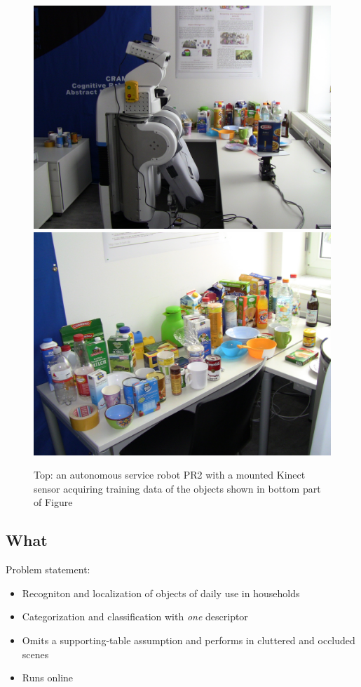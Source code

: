 \documentclass[conference]{sty/IEEEtran}
\begin{document}
\begin{figure}[htb!]
  \begin{center}
    \includegraphics[width=.9\columnwidth]{figures/objects/pr2_rot_table.jpg}
    \includegraphics[width=.9\columnwidth]{figures/objects/objects.jpg}
    \caption{Top: an autonomous service robot PR2 with a mounted Kinect sensor
    acquiring training data of the objects shown in bottom part of Figure}
    \label{fig:robot}
  \end{center}
\end{figure}

\subsection{What}
Problem statement:
\begin{itemize}
\item Recogniton and localization of objects of daily use in households
\item Categorization and classification with \emph{one} descriptor
\item Omits a supporting-table assumption and performs in cluttered and occluded scenes
\item Runs online
\end{itemize}
\end{document}
